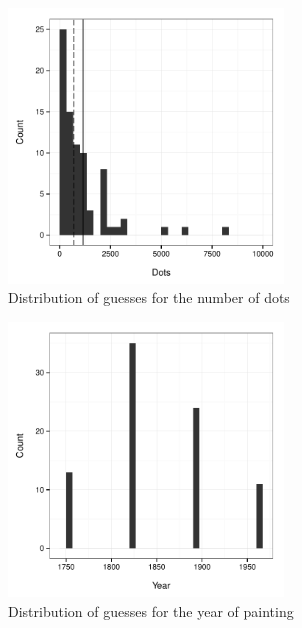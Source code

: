 \documentclass{article}
\begin{document}
 

 



    



				
\newpage

\begin{figure}
\begin{center}
\includegraphics[width=0.65\textwidth]{../../output/inClass_exp/dots.pdf}
\caption{Distribution of guesses for the number of dots}
\label{nrDots}
\end{center}	
\end{figure}




\begin{figure}
\begin{center}
\includegraphics[width=0.65\textwidth]{../../output/inClass_exp/painting.pdf}
\caption{Distribution of guesses for the year of painting}
\label{painting}
\end{center}	
\end{figure}
\end{document}
